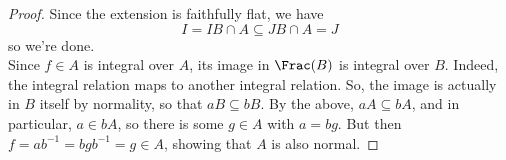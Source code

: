 \begin{proof}
	Since the extension is faithfully flat, we have
	\[ I = IB \cap A \subseteq JB \cap A = J \]
	so we're done. \\
	
	Since $f \in A$ is integral over $A$, its image in $\Frac(B)$ is integral over $B$. Indeed, the integral relation maps to another integral relation. So, the image is actually in $B$ itself by normality, so that $aB \subseteq bB$. By the above, $aA \subseteq bA$, and in particular, $a \in bA$, so there is some $g \in A$ with $a = bg$. But then $f = ab^{-1} = bgb^{-1} = g \in A$, showing that $A$ is also normal.
\end{proof}
